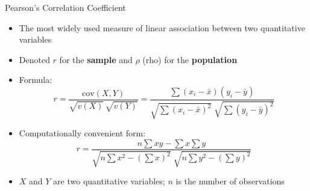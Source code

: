 \documentclass[12pt, aspectratio=169]{beamer}
\begin{document}
    \begin{frame}{Pearson's Correlation Coefficient}
        \begin{itemize}
            \item The most widely used measure of linear association between two
                quantitative variables
            \item Denoted $r$ for the \textbf{sample} and $\rho$ (rho) for the
                \textbf{population}
            \item Formula:
            \[
                r = \frac{\text{cov}(X,Y)}{\sqrt{v(X)}\,\sqrt{v(Y)}}
                  = \frac{\displaystyle\sum (x_i-\bar{x})(y_i-\bar{y})}
                         {\sqrt{\displaystyle\sum(x_i-\bar{x})^2}\;
                          \sqrt{\displaystyle\sum(y_i-\bar{y})^2}}
            \]
            \item Computationally convenient form:
            \[
                r = \frac{n\sum xy - \sum x\sum y}
                         {\sqrt{n\sum x^2 - \left(\sum x\right)^2}\;
                          \sqrt{n\sum y^2 - \left(\sum y\right)^2}}
            \]
            \item $X$ and $Y$ are two quantitative variables; $n$ is the number
                of observations
        \end{itemize}
    \end{frame}
\end{document}
